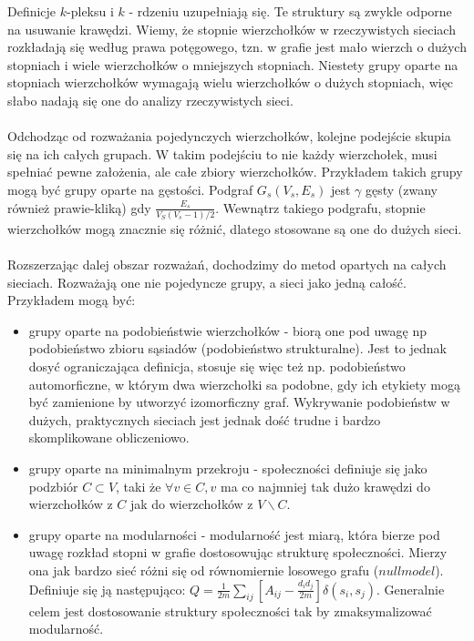 \documentclass{article}
\begin{document}
Definicje $k$-pleksu i $k$ - rdzeniu uzupełniają się. Te struktury są zwykle odporne na usuwanie krawędzi. Wiemy, że stopnie wierzchołków w rzeczywistych sieciach rozkładają się według prawa potęgowego, tzn. w grafie jest mało wierzch o dużych stopniach i wiele wierzchołków o mniejszych stopniach. Niestety grupy oparte na stopniach wierzchołków wymagają wielu wierzchołków o dużych stopniach, więc słabo nadają się one do analizy rzeczywistych sieci.
\\ \\
Odchodząc od rozważania pojedynczych wierzchołków, kolejne podejście skupia się na ich całych grupach. W takim podejściu to nie każdy wierzchołek, musi spełniać pewne założenia, ale całe zbiory wierzchołków. Przykładem takich grupy mogą być grupy oparte na gęstości. Podgraf $G_s(V_s,E_s)$ jest $\gamma$ gęsty (zwany również prawie-kliką) gdy $\frac{E_s}{V_S(V_s-1)/2}$. Wewnątrz takiego podgrafu, stopnie wierzchołków mogą znacznie się różnić, dlatego stosowane są one do dużych sieci.
\\\\
Rozszerzając dalej obszar rozważań, dochodzimy do metod opartych na całych sieciach. Rozważają one nie pojedyncze grupy, a sieci jako jedną całość. Przykładem mogą być: 
\begin{itemize}
\item grupy oparte na podobieństwie wierzchołków - biorą one pod uwagę np podobieństwo zbioru sąsiadów (podobieństwo strukturalne). Jest to jednak dosyć ograniczająca definicja, stosuje się więc też np. podobieństwo automorficzne, w którym dwa wierzchołki sa podobne, gdy ich etykiety mogą być zamienione by utworzyć izomorficzny graf. Wykrywanie podobieństw w dużych, praktycznych sieciach jest jednak dość trudne i bardzo skomplikowane obliczeniowo.
\item grupy oparte na minimalnym przekroju - społeczności definiuje się jako podzbiór $C \subset V$, taki że $\forall v \in C, v$ ma co najmniej tak dużo krawędzi do wierzchołków z $C$ jak do wierzchołków z $V \backslash C$.
\item grupy oparte na modularności - modularność jest miarą, która bierze pod uwagę rozkład stopni w grafie dostosowując strukturę społeczności. Mierzy ona jak bardzo sieć różni się od równomiernie losowego grafu ($null model$). Definiuje się ją następująco: $Q= \frac{1}{2m} \sum\limits_{ij} [A_{ij} - \frac{d_i d_j}{2m}]\delta(s_i,s_j)$. Generalnie celem jest dostosowanie struktury społeczności tak by zmaksymalizować modularność.
\end{itemize}
\end{document}
